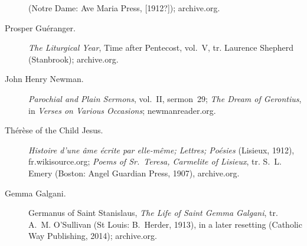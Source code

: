 \begin{description}
  (Notre Dame: Ave Maria Press, [1912?]); archive.org.
\item[Prosper Guéranger.] \emph{The Liturgical Year}, Time after
  Pentecost, vol.~V, tr. Laurence Shepherd (Stanbrook); archive.org.
\item[John Henry Newman.] \emph{Parochial and Plain Sermons}, vol.~II,
  sermon~29; \emph{The Dream of Gerontius}, in \emph{Verses on Various
  Occasions}; newmanreader.org.
\item[Thérèse of the Child Jesus.] \emph{Histoire d'une âme écrite par
  elle-même; Lettres; Poésies} (Lisieux, 1912), fr.wikisource.org;
  \emph{Poems of Sr.\ Teresa, Carmelite of Lisieux}, tr. S.~L. Emery
  (Boston: Angel Guardian Press, 1907), archive.org.
\item[Gemma Galgani.] Germanus of Saint Stanislaus, \emph{The Life of
  Saint Gemma Galgani}, tr. A.~M. O'Sullivan (St Louis: B.~Herder, 1913),
  in a later resetting (Catholic Way Publishing, 2014); archive.org.
\end{description}

